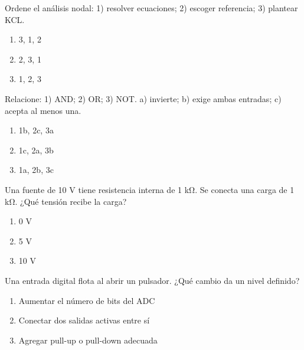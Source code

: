 \noindent\begin{minipage}{\linewidth}\setlength{\parskip}{4pt}\label{q:H-017}
Ordene el análisis nodal: 1) resolver ecuaciones; 2) escoger referencia; 3) plantear KCL.
\begin{enumerate}[label=\Alph*),nosep]
\item 3, 1, 2
\item 2, 3, 1
\item 1, 2, 3
\end{enumerate}\end{minipage}\par\medskip

\noindent\begin{minipage}{\linewidth}\setlength{\parskip}{4pt}\label{q:H-018}
Relacione: 1) AND; 2) OR; 3) NOT. a) invierte; b) exige ambas entradas; c) acepta al menos una.
\begin{enumerate}[label=\Alph*),nosep]
\item 1b, 2c, 3a
\item 1c, 2a, 3b
\item 1a, 2b, 3c
\end{enumerate}\end{minipage}\par\medskip

\noindent\begin{minipage}{\linewidth}\setlength{\parskip}{4pt}\label{q:H-019}
Una fuente de 10 V tiene resistencia interna de 1 kΩ. Se conecta una carga de 1 kΩ. ¿Qué tensión recibe la carga?
\begin{enumerate}[label=\Alph*),nosep]
\item 0 V
\item 5 V
\item 10 V
\end{enumerate}\end{minipage}\par\medskip

\noindent\begin{minipage}{\linewidth}\setlength{\parskip}{4pt}\label{q:H-020}
Una entrada digital flota al abrir un pulsador. ¿Qué cambio da un nivel definido?
\begin{enumerate}[label=\Alph*),nosep]
\item Aumentar el número de bits del ADC
\item Conectar dos salidas activas entre sí
\item Agregar pull-up o pull-down adecuada
\end{enumerate}\end{minipage}\par\medskip


